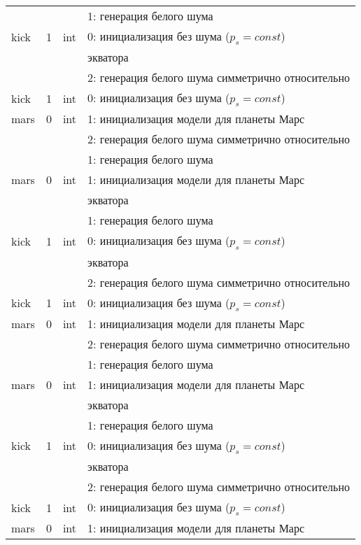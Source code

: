 \begin{longtable}[c]{|l|c|l|l|}
     &   &     & 1: генерация белого шума                  \\
    kick & 1 & int & 0: инициализация без шума (\(p_s = const\)) \\
          & & & экватора    \\
          &   &     & 2: генерация белого шума симметрично относительно \\
      kick & 1 & int & 0: инициализация без шума (\(p_s = const\)) \\
     mars & 0 & int & 1: инициализация модели для планеты Марс     \\
    &   &     & 2: генерация белого шума симметрично относительно \\
          &   &     & 1: генерация белого шума                  \\
          mars & 0 & int & 1: инициализация модели для планеты Марс     \\
      & & & экватора    \\
     &   &     & 1: генерация белого шума                  \\
    kick & 1 & int & 0: инициализация без шума (\(p_s = const\)) \\
          & & & экватора    \\
          &   &     & 2: генерация белого шума симметрично относительно \\
      kick & 1 & int & 0: инициализация без шума (\(p_s = const\)) \\
     mars & 0 & int & 1: инициализация модели для планеты Марс     \\
    &   &     & 2: генерация белого шума симметрично относительно \\
          &   &     & 1: генерация белого шума                  \\
          mars & 0 & int & 1: инициализация модели для планеты Марс     \\
      & & & экватора    \\
     &   &     & 1: генерация белого шума                  \\
    kick & 1 & int & 0: инициализация без шума (\(p_s = const\)) \\
          & & & экватора    \\
          &   &     & 2: генерация белого шума симметрично относительно \\
      kick & 1 & int & 0: инициализация без шума (\(p_s = const\)) \\
     mars & 0 & int & 1: инициализация модели для планеты Марс     \\

\end{longtable}
